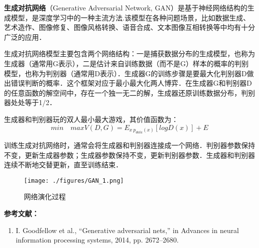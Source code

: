 
\textbf{生成对抗网络}（Generative Adversarial Network, GAN）是基于神经网络结构的生成模型，是深度学习中的一种主流方法.该模型在各种问题场景，比如数据生成、艺术造作、图像修复、图像风格转换、语音合成、文本图像互相转换等中均有十分广泛的应用．

生成对抗网络模型主要包含两个网络结构：一是捕获数据分布的生成模型，也称为生成器（通常用G表示），二是估计来自训练数据（而不是G）样本的概率的判别模型，也称为判别器（通常用D表示）．生成器G的训练步骤是要最大化判别器D做出错误判断的概率．这个框架对应于最小最大化两人博弈．在生成器G和判别器D的任意函数的解空间中，存在一个独一无二的解，生成器还原训练数据分布，判别器处处等于1/2．

生成器和判别器玩的双人最小最大游戏，其价值函数为：
\begin{equation}
min \quad maxV(D,G)=E_{x ~ p_{data}(x)}[logD(x)]+E
\end{equation}

训练生成对抗网络时，通常会将生成器和判别器连接成一个网络．判别器参数保持不变，更新生成器参数；生成器参数保持不变，更新判别器参数．生成器和判别器连续不断地交替更新，直至训练结束．
\begin{figure}[ht]
\centering
\texttt{[image: ./figures/GAN\_1.png]}
\caption{网络演化过程} \label{GAN_fig1}
\end{figure}





\textbf{参考文献：}
\begin{enumerate}
\item I. Goodfellow et al., “Generative adversarial nets,” in Advances in neural information processing systems, 2014, pp. 2672–2680.
\end{enumerate}